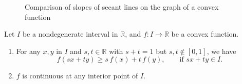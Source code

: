 \documentclass[11pt]{article}
\begin{document}
\begin{figure}
  \centering
  \caption{Comparison of slopes of secant lines on the graph of a convex function}
  \label{fig:convex-secant}
\end{figure}
\begin{thm}
  Let $I$ be a nondegenerate interval in $\mathbb{R}$, and $f : I \to \mathbb{R}$ be a convex function.
  \begin{enumerate}[$(a)$]
    \item For any $x,y$ in $I$ and $s, t \in \mathbb{R}$ with $s + t = 1$ but $s, t \notin [0,1]$, we have
      \[
	f(sx + ty) \geqslant s \, f(x) + t \, f(y), \qquad
	\text{if } sx + ty \in I.
      \]

    \item $f$ is continuous at any interior point of $I$.
  \end{enumerate}
\end{thm}
\end{document}
